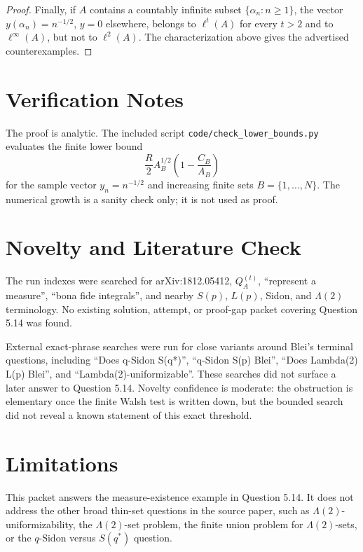 \documentclass[11pt]{article}
\begin{document}
\begin{proof}
Finally, if \(A\) contains a countably infinite subset \(\{\alpha_n:n\ge1\}\),
the vector \(y(\alpha_n)=n^{-1/2}\), \(y=0\) elsewhere, belongs to
\(\ell^t(A)\) for every \(t>2\) and to \(\ell^\infty(A)\), but not to
\(\ell^2(A)\).  The characterization above gives the advertised
counterexamples.
\end{proof}

\section*{Verification Notes}

The proof is analytic.  The included script
\texttt{code/check\_lower\_bounds.py} evaluates the finite lower bound
\[
  \frac{R}{2}A_B^{1/2}\left(1-\frac{C_B}{A_B}\right)
\]
for the sample vector \(y_n=n^{-1/2}\) and increasing finite sets
\(B=\{1,\ldots,N\}\).  The numerical growth is a sanity check only; it is not
used as proof.

\section*{Novelty and Literature Check}

The run indexes were searched for arXiv:1812.05412, \(Q_A^{(t)}\), ``represent
a measure'', ``bona fide integrals'', and nearby \(S(p)\), \(L(p)\), Sidon, and
\(\Lambda(2)\) terminology.  No existing solution, attempt, or proof-gap packet
covering Question 5.14 was found.

External exact-phrase searches were run for close variants around Blei's
terminal questions, including ``Does q-Sidon S(q*)'', ``q-Sidon S(p) Blei'',
``Does Lambda(2) L(p) Blei'', and ``Lambda(2)-uniformizable''.  These searches
did not surface a later answer to Question 5.14.  Novelty confidence is
moderate: the obstruction is elementary once the finite Walsh test is written
down, but the bounded search did not reveal a known statement of this exact
threshold.

\section*{Limitations}

This packet answers the measure-existence example in Question 5.14.  It does
not address the other broad thin-set questions in the source paper, such as
\(\Lambda(2)\)-uniformizability, the \(\Lambda(2)\)-set problem, the finite
union problem for \(\Lambda(2)\)-sets, or the \(q\)-Sidon versus \(S(q^*)\)
question.
\end{document}
